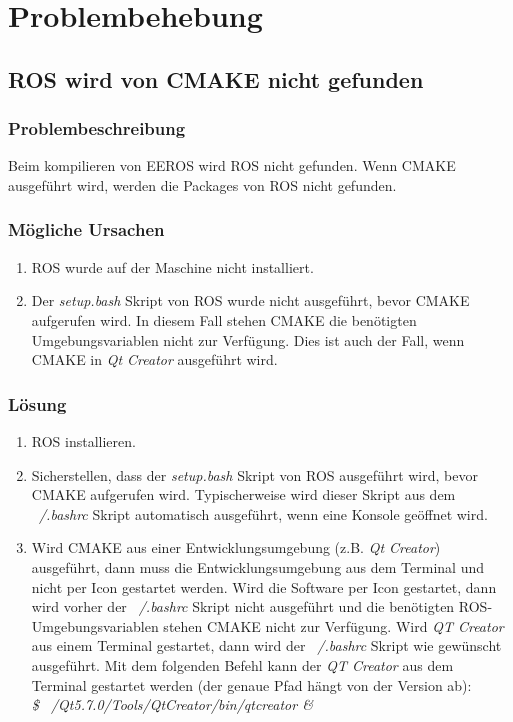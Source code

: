 \chapter{Problembehebung}
\label{chapter:problembehebung}

\section{ROS wird von CMAKE nicht gefunden}
\subsection{Problembeschreibung}
Beim kompilieren von EEROS wird ROS nicht gefunden.
Wenn CMAKE ausgeführt wird, werden die Packages von ROS nicht gefunden.

\subsection{Mögliche Ursachen}
\begin{enumerate}
\item ROS wurde auf der Maschine nicht installiert.
\item Der \textit{setup.bash} Skript von ROS wurde nicht ausgeführt, bevor CMAKE aufgerufen wird.
In diesem Fall stehen CMAKE die benötigten Umgebungsvariablen nicht zur Verfügung.
Dies ist auch der Fall, wenn CMAKE in \textit{Qt Creator} ausgeführt wird.
\end{enumerate}

\subsection{Lösung}
\begin{enumerate}
\item ROS installieren.
\item Sicherstellen, dass der \textit{setup.bash} Skript von ROS ausgeführt wird, bevor CMAKE aufgerufen wird.
Typischerweise wird dieser Skript aus dem \textit{~/.bashrc} Skript automatisch ausgeführt, wenn eine Konsole geöffnet wird.
\item Wird CMAKE aus einer Entwicklungsumgebung (z.B. \textit{Qt Creator}) ausgeführt, dann muss die Entwicklungsumgebung aus dem Terminal und nicht per Icon gestartet werden.
Wird die Software per Icon gestartet, dann wird vorher der \textit{~/.bashrc} Skript nicht ausgeführt und die benötigten ROS-Umgebungsvariablen stehen CMAKE nicht zur Verfügung.
Wird \textit{QT Creator} aus einem Terminal gestartet, dann wird der \textit{~/.bashrc} Skript wie gewünscht ausgeführt.
Mit dem folgenden Befehl kann der \textit{QT Creator} aus dem Terminal gestartet werden (der genaue Pfad hängt von der Version ab):\\
\textit{\$ ~/Qt5.7.0/Tools/QtCreator/bin/qtcreator \&}
\end{enumerate}



